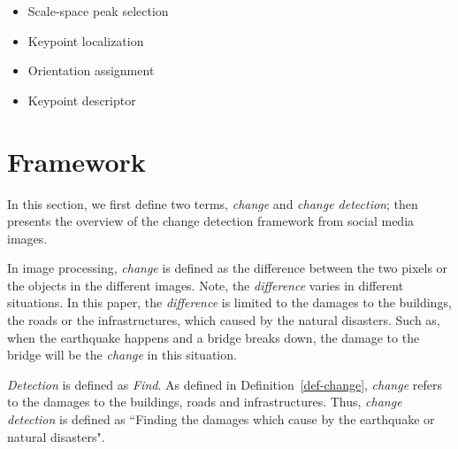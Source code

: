 \documentclass[runningheads,a4paper]{llncs}
\begin{document}
\begin{itemize}
\item Scale-space peak selection
\item Keypoint localization
\item Orientation assignment
\item Keypoint descriptor
\end{itemize}


\section{Framework}\label{sec-framework}

In this section,
we first define two terms, \emph{change} and \emph{change detection}; 
then presents the overview of the change detection framework from social media images. 

\begin{definition}\label{def-change}
In image processing, \emph{change} is defined as the difference between the two pixels or the objects in the different images. 
Note, the \emph{difference} varies in different situations. 
In this paper, the \emph{difference} is limited to the damages to the buildings, the roads or the infrastructures, which caused by the natural disasters. Such as, when the earthquake happens and a bridge breaks down, the damage to the bridge will be the \emph{change} in this situation.  
\end{definition}

\begin{definition}
\emph{Detection} is defined as \emph{Find}.
As defined in Definition~\ref{def-change}, \emph{change} refers to the damages to the buildings, roads and infrastructures.
Thus, \emph{change detection} is defined as ``Finding the damages which cause by the earthquake or natural disasters".
\end{definition}
\end{document}
